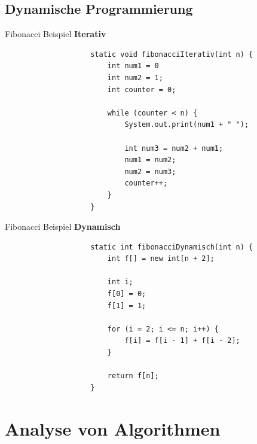 \documentclass[a4paper, landscape, 8pt]{scrartcl}
\begin{document}
\begin{multicols*}{4}
            \subsection{Dynamische Programmierung}
            \textcolor{subsectioncolor}{Fibonacci Beispiel {\bfseries Iterativ}}
            \begin{lstlisting}
                    static void fibonacciIterativ(int n) {
                        int num1 = 0
                        int num2 = 1;
                        int counter = 0;

                        while (counter < n) {
                            System.out.print(num1 + " ");

                            int num3 = num2 + num1;
                            num1 = num2;
                            num2 = num3;
                            counter++;
                        }
                    }
            \end{lstlisting}
            \textcolor{subsectioncolor}{Fibonacci Beispiel {\bfseries Dynamisch}}
            \begin{lstlisting}
                    static int fibonacciDynamisch(int n) {
                        int f[] = new int[n + 2];

                        int i;
                        f[0] = 0;
                        f[1] = 1;

                        for (i = 2; i <= n; i++) {
                            f[i] = f[i - 1] + f[i - 2];
                        }

                        return f[n];
                    }
            \end{lstlisting}

        \section{Analyse von Algorithmen}

\end{multicols*}
\end{document}
